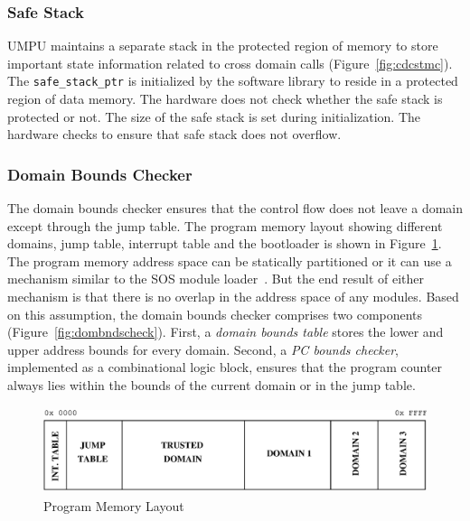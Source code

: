 \subsubsection{Safe Stack}
\label{sec:umpuss}
%
UMPU maintains a separate stack in the protected region of memory to
store important state information related to cross domain calls
(Figure~\ref{fig:cdcstmc}).
%
The \texttt{safe\_stack\_ptr} is initialized by the software library
to reside in a protected region of data memory.
%
The hardware does not check whether the safe stack is protected or not.
%
The size of the safe stack is set during initialization.
%
The hardware checks to ensure that safe stack does not overflow.
%
\subsubsection{Domain Bounds Checker}
\label{sec:dombndschecker}
%
The domain bounds checker ensures that the control flow does not leave
a domain except through the jump table.
%
The program memory layout showing different domains, jump table,
interrupt table and the bootloader is shown in
Figure~\ref{fig:progmemlayout}.
%
The program memory address space can be statically partitioned
or it can use a mechanism similar to the SOS module
loader~\cite{ram05sos}.
%
But the end result of either mechanism is that there is no overlap in
the address space of any modules.
%
Based on this assumption, the domain bounds checker comprises two
components (Figure~\ref{fig:dombndscheck}).
%
First, a \emph{domain bounds table} stores the lower and upper
address bounds for every domain.
%
Second, a \emph{PC bounds checker}, implemented as a combinational
logic block, ensures that the program counter always lies within the
bounds of the current domain or in the jump table.
%
\begin{figure}[htbp]
   \centering
   \includegraphics[height=1in,
   keepaspectratio=true]{figures/progmemlayout.eps} 
   \caption{Program Memory Layout}
   \label{fig:progmemlayout}
\end{figure}
